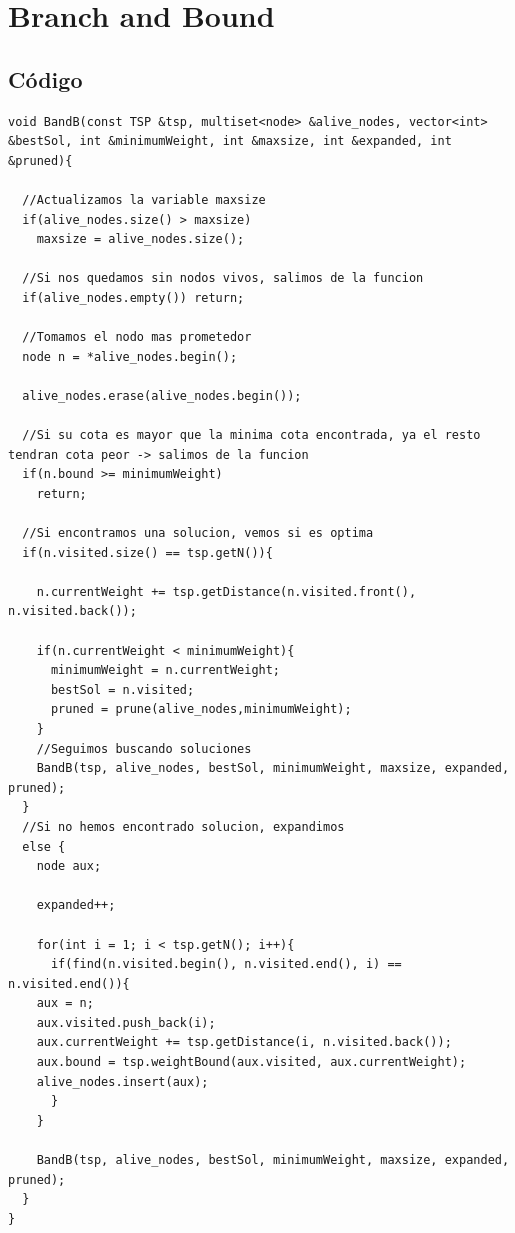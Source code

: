 \documentclass[a4]{article}
\begin{document}
\section{Branch and Bound}

\subsection{Código}

\begin{lstlisting}
void BandB(const TSP &tsp, multiset<node> &alive_nodes, vector<int> &bestSol, int &minimumWeight, int &maxsize, int &expanded, int &pruned){

  //Actualizamos la variable maxsize
  if(alive_nodes.size() > maxsize)
    maxsize = alive_nodes.size();

  //Si nos quedamos sin nodos vivos, salimos de la funcion
  if(alive_nodes.empty()) return;

  //Tomamos el nodo mas prometedor
  node n = *alive_nodes.begin();

  alive_nodes.erase(alive_nodes.begin());

  //Si su cota es mayor que la minima cota encontrada, ya el resto tendran cota peor -> salimos de la funcion
  if(n.bound >= minimumWeight)
    return;

  //Si encontramos una solucion, vemos si es optima
  if(n.visited.size() == tsp.getN()){
 
    n.currentWeight += tsp.getDistance(n.visited.front(), n.visited.back());

    if(n.currentWeight < minimumWeight){
      minimumWeight = n.currentWeight;
      bestSol = n.visited;
      pruned = prune(alive_nodes,minimumWeight);
    }
    //Seguimos buscando soluciones
    BandB(tsp, alive_nodes, bestSol, minimumWeight, maxsize, expanded, pruned);
  }
  //Si no hemos encontrado solucion, expandimos
  else { 
    node aux;

    expanded++;
  
    for(int i = 1; i < tsp.getN(); i++){
      if(find(n.visited.begin(), n.visited.end(), i) == n.visited.end()){
	aux = n;
	aux.visited.push_back(i);
	aux.currentWeight += tsp.getDistance(i, n.visited.back());
	aux.bound = tsp.weightBound(aux.visited, aux.currentWeight);
	alive_nodes.insert(aux);
      }
    }

    BandB(tsp, alive_nodes, bestSol, minimumWeight, maxsize, expanded, pruned);
  }
}

\end{lstlisting}
\end{document}
